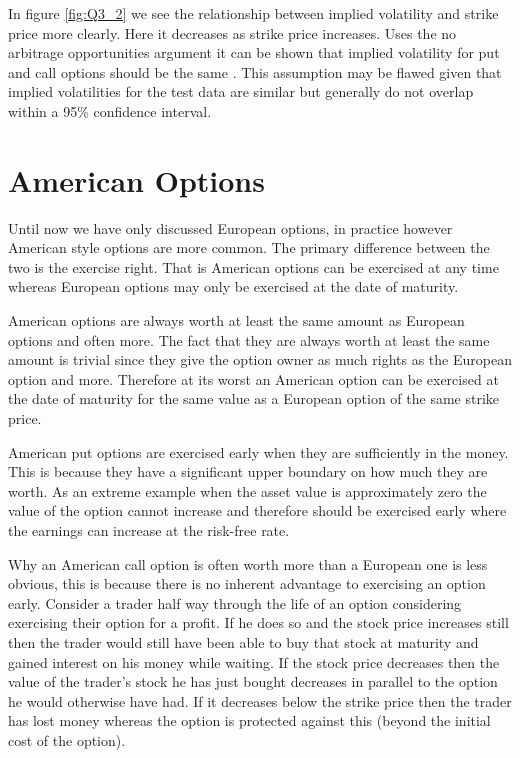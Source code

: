 \documentclass{sig-alternate-05-2015}
\begin{document}
In figure \ref{fig:Q3_2} we see the relationship between implied volatility and strike price more clearly. Here it decreases as strike price increases. Uses the no arbitrage opportunities argument it can be shown that implied volatility for put and call options should be the same \cite{book1}. This assumption may be flawed given that implied volatilities for the test data are similar but generally do not overlap within a 95\% confidence interval. 

\section{American Options}
Until now we have only discussed European options, in practice however American style options are more common. The primary difference between the two is the exercise right. That is American options can be exercised at any time whereas European options may only be exercised at the date of maturity. 

American options are always worth at least the same amount as European options and often more. The fact that they are always worth at least the same amount is trivial since they give the option owner as much rights as the European option and more. Therefore at its worst an American option can be exercised at the date of maturity for the same value as a European option of the same strike price. 

American put options are exercised early when they are sufficiently in the money. This is because they have a significant upper boundary on how much they are worth. As an extreme example when the asset value is approximately zero the value of the option cannot increase and therefore should be exercised early where the earnings can increase at the risk-free rate. 

Why an American call option is often worth more than a European one is less obvious, this is because there is no inherent advantage to exercising an option early. Consider a trader half way through the life of an option considering exercising their option for a profit. If he does so and the stock price increases still then the trader would still have been able to buy that stock at maturity and gained interest on his money while waiting. If the stock price decreases then the value of the trader's stock he has just bought decreases in parallel to the option he would otherwise have had. If it decreases below the strike price then the trader has lost money whereas the option is protected against this (beyond the initial cost of the option). 
\end{document}
